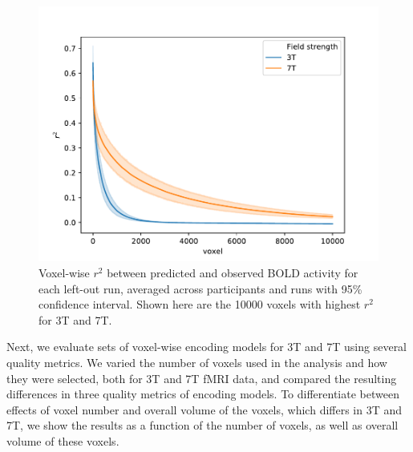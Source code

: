 \begin{figure}
  \centering
  \includegraphics[width=\linewidth]{pics/r2_plot.pdf}
	
    \caption{Voxel-wise $r^{2}$ between predicted and observed BOLD activity for each left-out run, averaged across participants and runs with 95\% confidence interval. Shown here are the 10000 voxels with highest $r^{2}$ for 3T and 7T.
  }

 \label{fig:r2_plot}\end{figure}

Next, we evaluate sets of voxel-wise encoding models for 3T and 7T using several quality metrics. We varied the number of voxels used in the analysis and how they were selected, both for 3T and 7T f{MRI} data, and compared the resulting differences in three quality metrics of encoding models. To differentiate between effects of voxel number and overall volume of the voxels, which differs in 3T and 7T, we show the results as a function of the number of voxels, as well as overall volume of these voxels.

